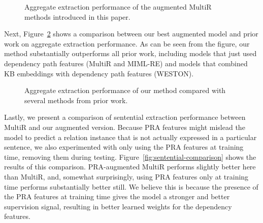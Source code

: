 \documentclass[11pt,a4paper]{article}
\newcommand{\figref}[1]{Figure~\ref{fig:#1}}
\begin{document}
\begin{figure}
  \centering
  \caption{Aggregate extraction performance of the augmented MultiR methods
  introduced in this paper.}
  \label{fig:our-comparison}
\end{figure}

Next, \figref{prior-work-comparison} shows a comparison between our best
augmented model and prior work on aggregate extraction performance.  As can be
seen from the figure, our method substantially outperforms all prior work,
including models that just used dependency path features (MultiR and MIML-RE)
and models that combined KB embeddings with dependency path features (WESTON).

\begin{figure}
  \centering
  \caption{Aggregate extraction performance of our method compared with several
  methods from prior work.}
  \label{fig:prior-work-comparison}
\end{figure}

Lastly, we present a comparison of sentential extraction performance between
MultiR and our augmented version.  Because PRA features might mislead the model
to predict a relation instance that is not actually expressed in a particular
sentence, we also experimented with only using the PRA features at training
time, removing them during testing.  \figref{sentential-comparison} shows the
results of this comparison.  PRA-augmented MultiR performs slightly better here
than MultiR, and, somewhat surprisingly, using PRA features only at training
time performs substantially better still.  We believe this is because the
presence of the PRA features at training time gives the model a stronger and
better supervision signal, resulting in better learned weights for the
dependency features.
\end{document}
